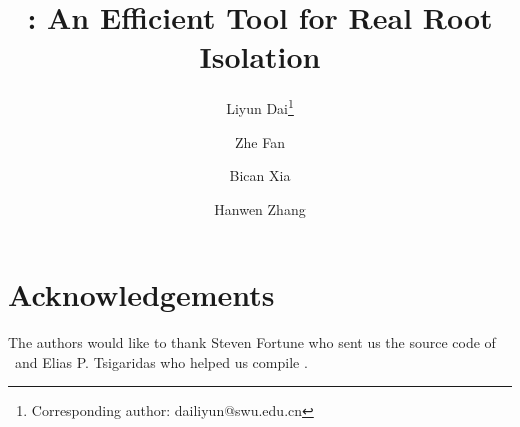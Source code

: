 \documentclass[10pt,a4paper]{article}
\begin{document}
	
	\title{\froot: An Efficient Tool for Real Root Isolation}
		
		\author[1]{Liyun Dai\thanks{Corresponding author: dailiyun@swu.edu.cn}	}
		\author[2]{Zhe Fan} %
		\author[2]{Bican Xia} %
		\author[2]{Hanwen Zhang} %
	
	
	\renewcommand\Authands{ and }
\date{}
\maketitle















%
%


\section*{Acknowledgements}
The authors would like to thank Steven Fortune who sent us the source code of \eign\ and Elias P. Tsigaridas who helped us compile \cf.





\end{document}
